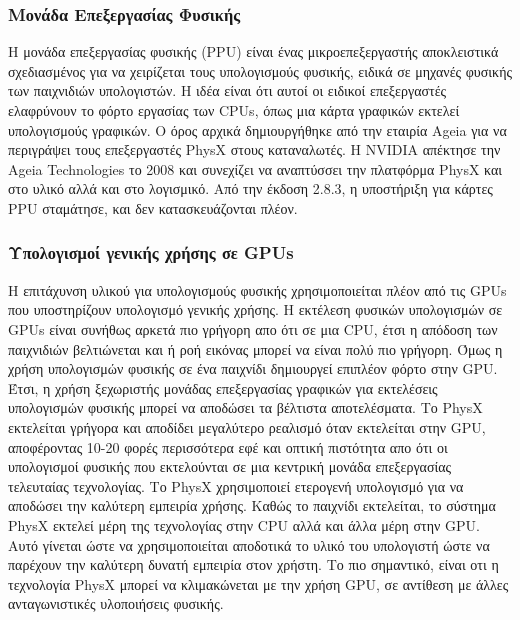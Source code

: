 \subsubsection{Μονάδα Επεξεργασίας Φυσικής}
Η μονάδα επεξεργασίας φυσικής (PPU) είναι ένας μικροεπεξεργαστής αποκλειστικά σχεδιασμένος για να χειρίζεται τους υπολογισμούς φυσικής, ειδικά σε μηχανές φυσικής των παιχνιδιών υπολογιστών. Η ιδέα είναι ότι αυτοί οι ειδικοί επεξεργαστές ελαφρύνουν το φόρτο εργασίας των CPUs, όπως μια κάρτα γραφικών εκτελεί υπολογισμούς γραφικών. Ο όρος αρχικά δημιουργήθηκε από την εταιρία Ageia για να περιγράψει τους επεξεργαστές PhysX στους καταναλωτές.
H NVIDIA απέκτησε την Ageia Technologies το 2008 και συνεχίζει να αναπτύσσει την πλατφόρμα PhysX και στο υλικό αλλά και στο λογισμικό. Από την έκδοση 2.8.3, η υποστήριξη για κάρτες PPU σταμάτησε, και δεν κατασκευάζονται πλέον.  
\subsubsection{Υπολογισμοί γενικής χρήσης σε GPUs}
Η επιτάχυνση υλικού για υπολογισμούς φυσικής χρησιμοποιείται πλέον από τις GPUs που υποστηρίζουν υπολογισμό γενικής χρήσης. Η εκτέλεση φυσικών υπολογισμών σε GPUs είναι συνήθως αρκετά πιο γρήγορη απο ότι σε μια CPU, έτσι η απόδοση των παιχνιδιών βελτιώνεται και ή ροή εικόνας μπορεί να είναι πολύ πιο γρήγορη. Όμως η χρήση υπολογισμών φυσικής σε ένα παιχνίδι δημιουργεί επιπλέον φόρτο στην GPU. Έτσι, η χρήση ξεχωριστής μονάδας επεξεργασίας γραφικών για εκτελέσεις υπολογισμών φυσικής μπορεί να αποδώσει τα βέλτιστα αποτελέσματα. Το PhysX εκτελείται γρήγορα και αποδίδει μεγαλύτερο ρεαλισμό όταν εκτελείται στην GPU, αποφέροντας 10-20 φορές περισσότερα εφέ και οπτική πιστότητα απο ότι οι υπολογισμοί φυσικής που εκτελούνται σε μια κεντρική μονάδα επεξεργασίας τελευταίας τεχνολογίας. Το PhysX χρησιμοποιεί ετερογενή υπολογισμό για να αποδώσει την καλύτερη εμπειρία χρήσης. Καθώς το παιχνίδι εκτελείται, το σύστημα PhysX εκτελεί μέρη της τεχνολογίας στην CPU αλλά και άλλα μέρη στην GPU. Αυτό γίνεται ώστε να χρησιμοποιείται αποδοτικά το υλικό του υπολογιστή ώστε να παρέχουν την καλύτερη δυνατή εμπειρία στον χρήστη. Το πιο σημαντικό, είναι οτι η τεχνολογία PhysX μπορεί να κλιμακώνεται με την χρήση GPU, σε αντίθεση με άλλες ανταγωνιστικές υλοποιήσεις φυσικής.
